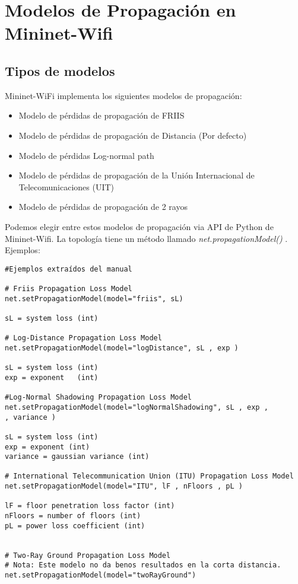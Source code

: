 \section{Modelos de Propagación en Mininet-Wifi}
\subsection{Tipos de modelos}
Mininet-WiFi implementa los siguientes modelos de propagación:
\begin{itemize}
    \item Modelo de pérdidas de propagación de FRIIS
    \item Modelo de pérdidas de propagación de Distancia (Por defecto)
    \item Modelo de pérdidas Log-normal path
    \item Modelo de pérdidas de propagación de la Unión Internacional de Telecomunicaciones (UIT)
    \item Modelo de pérdidas de propagación de 2 rayos 
\end{itemize}
Podemos elegir entre estos modelos de propagación via API de Python de Mininet-Wifi. La topología tiene un método llamado \textit{net.propagationModel()} . Ejemplos:

\begin{verbatim}
#Ejemplos extraídos del manual

# Friis Propagation Loss Model
net.setPropagationModel(model="friis", sL)

sL = system loss (int)

# Log-Distance Propagation Loss Model
net.setPropagationModel(model="logDistance", sL , exp )

sL = system loss (int)
exp = exponent   (int)

#Log-Normal Shadowing Propagation Loss Model
net.setPropagationModel(model="logNormalShadowing", sL , exp ,
, variance )

sL = system loss (int)
exp = exponent (int)
variance = gaussian variance (int)

# International Telecommunication Union (ITU) Propagation Loss Model
net.setPropagationModel(model="ITU", lF , nFloors , pL )

lF = floor penetration loss factor (int)
nFloors = number of floors (int)
pL = power loss coefficient (int)


# Two-Ray Ground Propagation Loss Model
# Nota: Este modelo no da benos resultados en la corta distancia.
net.setPropagationModel(model="twoRayGround")

\end{verbatim}
\newpage